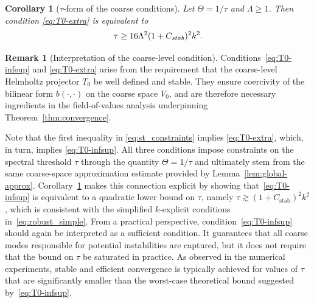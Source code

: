 \documentclass[preprint,3p,times]{elsarticle}
\newcommand{\Cstab}{C_{\textup{\textsf{stab}}}}
\newtheorem{corollary}[theorem]{Corollary}
\theoremstyle{definition}
\newtheorem{remark}[theorem]{Remark}
\numberwithin{equation}{section}
\begin{document}
\begin{corollary}[$\tau$-form of the coarse conditions]\label{cor:T0-tau}
Let $\Theta=1/\tau$ and $\Lambda\ge 1$. Then condition \eqref{eq:T0-extra} is equivalent to
\begin{equation}\label{eq:T0-solv-tau}
		\tau \ge 16\Lambda^2(1+\Cstab)^2k^2.
\end{equation}
\end{corollary}

\begin{remark}[Interpretation of the coarse-level condition]\label{rem:T0_condition}
{Conditions~\eqref{eq:T0-infsup} and \eqref{eq:T0-extra} arise from the requirement that the coarse-level Helmholtz projector $T_0$ 
be well defined and stable.  They ensure coercivity of the bilinear form $b(\cdot,\cdot)$ on the coarse space $V_0$, 
and are therefore necessary ingredients in the field-of-values analysis underpinning Theorem~\ref{thm:convergence}.}

{Note that the first inequality in \eqref{eq:st_constraints} implies \eqref{eq:T0-extra}, which, in turn, implies \eqref{eq:T0-infsup}.
All three conditions impose constraints on the spectral threshold $\tau$ through the quantity $\Theta = 1/\tau$
and ultimately stem from the same coarse-space approximation estimate provided by Lemma~\ref{lem:global-approx}. 
Corollary~\ref{cor:T0-tau} makes this connection explicit by showing that~\eqref{eq:T0-infsup} is equivalent to a quadratic lower bound on $\tau$, 
namely $\tau \gtrsim (1+C_{\mathrm{stab}})^2 k^2$, which is consistent with the simplified $k$-explicit conditions in~\eqref{eq:robust_simple}.
From a practical perspective, condition~\eqref{eq:T0-infsup} should again be interpreted as a sufficient condition. 
It guarantees that all coarse modes responsible for potential instabilities are captured, 
but it does not require that the bound on $\tau$ be saturated in practice. 
As observed in the numerical experiments, stable and efficient convergence is typically achieved for values of $\tau$ 
that are significantly smaller than the worst-case theoretical bound suggested by~\eqref{eq:T0-infsup}. 
}
\end{remark}
\end{document}
